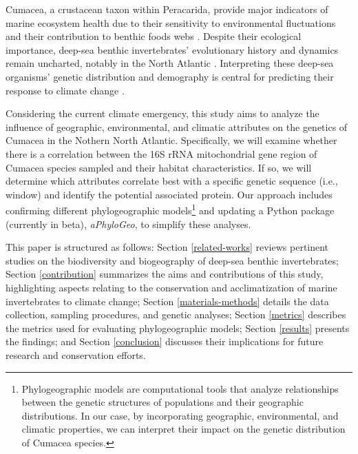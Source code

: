 Cumacea, a crustacean taxon within Peracarida, provide major indicators of marine ecosystem health due to their sensitivity to environmental fluctuations \citep{stransky_diversity_2010} and their contribution to benthic foods webs \citep{rehm2009cumacea}. Despite their ecological importance, deep-sea benthic invertebrates’ evolutionary history and dynamics remain uncharted, notably in the North Atlantic \citep{jennings_phylogeographic_2014}. Interpreting these deep-sea organisms' genetic distribution and demography is central for predicting their response to climate change \citep{jennings_phylogeographic_2014}. 

Considering the current climate emergency, this study aims to analyze the influence of geographic, environmental, and climatic attributes on the genetics of Cumacea in the Nothern North Atlantic. Specifically, we will examine whether there is a correlation between the 16S rRNA mitochondrial gene region of Cumacea species sampled and their habitat characteristics. If so, we will determine which attributes correlate best with a specific genetic sequence (i.e., window) and identify the potential associated protein. Our approach includes confirming different {phylogeographic models}\footnote{Phylogeographic models are computational tools that analyze relationships between the genetic structures of populations and their geographic distributions. In our case, by incorporating geographic, environmental, and climatic properties, we can interpret their impact on the genetic distribution of Cumacea species.} and updating a Python package (currently in beta), \textit{aPhyloGeo}, to simplify these analyses.

This paper is structured as follows: Section \autoref{related-works} reviews pertinent studies on the biodiversity and biogeography of deep-sea benthic invertebrates; Section \autoref{contribution} summarizes the aims and contributions of this study, highlighting aspects relating to the conservation and acclimatization of marine invertebrates to climate change; Section \autoref{materials-methods} details the data collection, sampling procedures, and genetic analyses; Section \autoref{metrics} describes the metrics used for evaluating phylogeographic models; Section \autoref{results} presents the findings; and Section \autoref{conclusion}  discusses their implications for future research and conservation efforts.

